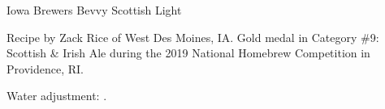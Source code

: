 \stylesection{\stylescottishlight}

\begin{recipe}{Iowa Brewers Bevvy Scottish Light}

\begin{aboutblock}
Recipe by Zack Rice of West Des Moines, IA. Gold medal in Category \#9: Scottish \& Irish
Ale during the 2019 National Homebrew Competition in Providence, RI. \sourceaha
\end{aboutblock}


\begin{methodandtiming}
 
\begin{mashsteps}
\end{mashsteps}

\begin{fermentationsteps}
\end{fermentationsteps}

\begin{directions}
Water adjustment: .
\end{directions}

\end{methodandtiming}

\recipebreak

\begin{ingredientsblock}

\begin{malts}
\end{malts}

\begin{hops}
\end{hops}


\end{ingredientsblock}

\end{recipe}

